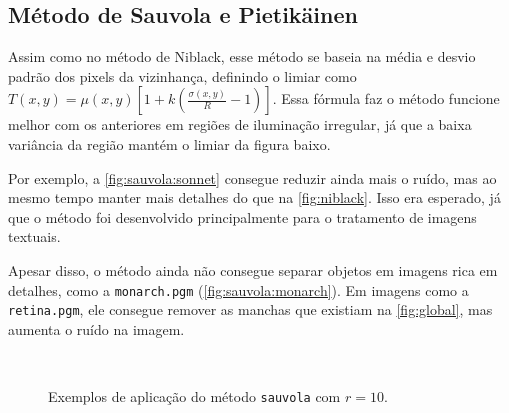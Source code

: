 \subsection{Método de Sauvola e Pietikäinen}

Assim como no método de Niblack, esse método se baseia na média e desvio padrão dos pixels da vizinhança, definindo o limiar como $T(x, y) = \mu(x, y) \left[1 + k \left(\frac{\sigma(x, y)}{R} - 1\right)\right]$. Essa fórmula faz o método funcione melhor com os anteriores em regiões de iluminação irregular, já que a baixa variância da região mantém o limiar da figura baixo.

Por exemplo, a \cref{fig:sauvola:sonnet} consegue reduzir ainda mais o ruído, mas ao mesmo tempo manter mais detalhes do que na \cref{fig:niblack}. Isso era esperado, já que o método foi desenvolvido principalmente para o tratamento de imagens textuais.

Apesar disso, o método ainda não consegue separar objetos em imagens rica em detalhes, como a \texttt{monarch.pgm} (\cref{fig:sauvola:monarch}). Em imagens como a \texttt{retina.pgm}, ele consegue remover as manchas que existiam na \cref{fig:global}, mas aumenta o ruído na imagem.

\begin{figure}[H]
    \centering
    \\[8pt]

    \caption{Exemplos de aplicação do método \texttt{sauvola} com $r = 10$.}
    \label{fig:sauvola}
\end{figure}